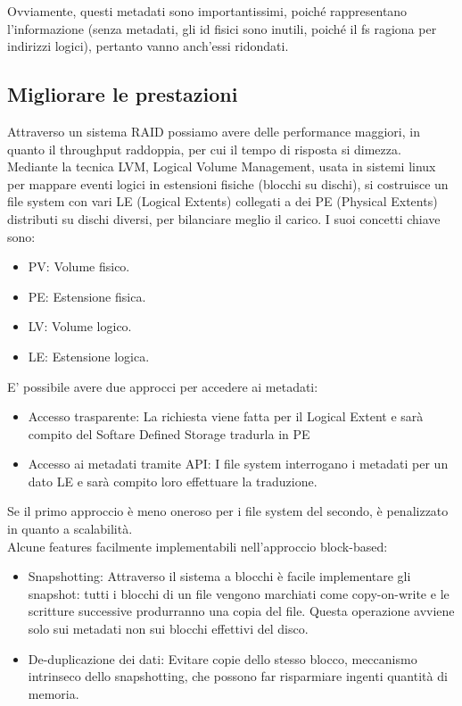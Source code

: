 \documentclass{article}
\begin{document}
		Ovviamente, questi metadati sono importantissimi, poiché rappresentano
		l’informazione (senza metadati, gli id fisici sono inutili, poiché il fs ragiona per indirizzi logici), pertanto vanno anch’essi ridondati.
		
		\subsection{Migliorare le prestazioni}
		Attraverso un sistema RAID possiamo avere delle performance maggiori, in quanto il throughput raddoppia, per cui il tempo di risposta si dimezza.\\
		 
		Mediante la tecnica LVM, Logical Volume Management, usata in sistemi linux per mappare eventi logici in estensioni fisiche (blocchi su dischi), si costruisce un file system con vari LE (Logical Extents) collegati a dei PE (Physical Extents) distributi su dischi diversi, per bilanciare meglio il carico. 
		I suoi concetti chiave sono:
		\begin{itemize}
		    \item PV: Volume fisico.
		    \item PE: Estensione fisica.
		    \item LV: Volume logico.
		    \item LE: Estensione logica.
		\end{itemize}
		E' possibile avere due approcci per accedere ai metadati:
		\begin{itemize}
		    \item Accesso trasparente: La richiesta viene fatta per il Logical Extent e sarà compito del Softare Defined Storage tradurla in PE
		    \item Accesso ai metadati tramite API: I file system interrogano i metadati per un dato LE e sarà compito loro effettuare la traduzione.
		\end{itemize}
		Se il primo approccio è meno oneroso per i file system del secondo, è penalizzato in quanto a scalabilità.\\
		
		Alcune features facilmente implementabili nell'approccio block-based:
		\begin{itemize}
		    \item Snapshotting: Attraverso il sistema a blocchi è facile implementare gli snapshot: tutti i blocchi di un file vengono marchiati come copy-on-write e le scritture successive produrranno una copia del file. Questa operazione avviene solo sui metadati non sui blocchi effettivi del disco.
		    \item De-duplicazione dei dati: Evitare copie dello stesso blocco, meccanismo intrinseco dello snapshotting, che possono far risparmiare ingenti quantità di memoria.
		\end{itemize}
		
\end{document}
